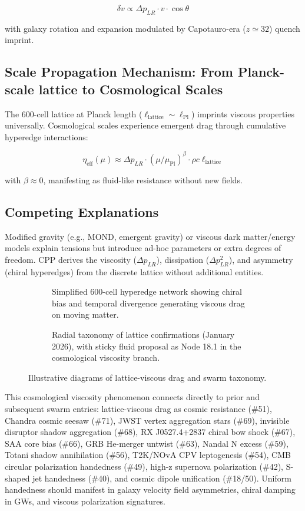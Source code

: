 \documentclass[11pt]{article}
\begin{document}
\[
\delta v \propto \Delta p_{LR} \cdot v \cdot \cos\theta
\]

with galaxy rotation and expansion modulated by Capotauro-era ($z \simeq 32$) quench imprint.

\subsection{Scale Propagation Mechanism: From Planck-scale lattice to Cosmological Scales}
The 600-cell lattice at Planck length ($\ell_{\text{lattice}} \sim \ell_{\text{Pl}}$) imprints viscous properties universally. Cosmological scales experience emergent drag through cumulative hyperedge interactions:

\[
\eta_{\text{eff}}(\mu) \approx \Delta p_{LR} \cdot (\mu / \mu_{\text{Pl}})^\beta \cdot \rho c \ell_{\text{lattice}}
\]

with $\beta \approx 0$, manifesting as fluid-like resistance without new fields.

\subsection{Competing Explanations}
Modified gravity (e.g., MOND, emergent gravity) or viscous dark matter/energy models explain tensions but introduce ad-hoc parameters or extra degrees of freedom. CPP derives the viscosity ($\Delta p_{LR}$), dissipation ($\Delta p_{LR}^2$), and asymmetry (chiral hyperedges) from the discrete lattice without additional entities.

\begin{figure}[htbp]
\centering
\begin{subfigure}{0.45\textwidth}
\centering
\caption{Simplified 600-cell hyperedge network showing chiral bias and temporal divergence generating viscous drag on moving matter.}
\label{fig:lattice-viscous}
\end{subfigure}
\hfill
\begin{subfigure}{0.45\textwidth}
\centering
\caption{Radial taxonomy of lattice confirmations (January 2026), with sticky fluid proposal as Node 18.1 in the cosmological viscosity branch.}
\label{fig:taxonomy}
\end{subfigure}
\caption{Illustrative diagrams of lattice-viscous drag and swarm taxonomy.}
\end{figure}

This cosmological viscosity phenomenon connects directly to prior and subsequent swarm entries: lattice-viscous drag as cosmic resistance (\#51), Chandra cosmic seesaw (\#71), JWST vertex aggregation stars (\#69), invisible disruptor shadow aggregation (\#68), RX J0527.4+2837 chiral bow shock (\#67), SAA core bias (\#66), GRB He-merger untwist (\#63), Nandal N excess (\#59), Totani shadow annihilation (\#56), T2K/NOvA CPV leptogenesis (\#54), CMB circular polarization handedness (\#49), high-z supernova polarization (\#42), S-shaped jet handedness (\#40), and cosmic dipole unification (\#18/50). Uniform handedness should manifest in galaxy velocity field asymmetries, chiral damping in GWs, and viscous polarization signatures.
\end{document}
